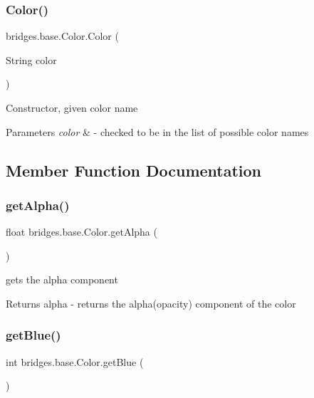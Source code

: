 \subsubsection{\texorpdfstring{Color()}{Color()}\hspace{0.1cm}{\footnotesize\ttfamily [4/4]}}
{\footnotesize\ttfamily bridges.\+base.\+Color.\+Color (\begin{DoxyParamCaption}\item[{String}]{color }\end{DoxyParamCaption})}

Constructor, given color name


\begin{DoxyParams}{Parameters}
{\em color} & -\/ checked to be in the list of possible color names \\
\hline
\end{DoxyParams}


\subsection{Member Function Documentation}
\mbox{\label{classbridges_1_1base_1_1_color_a7c4247e31ecd8fcc61ef208d5deefe68}} 
\subsubsection{\texorpdfstring{get\+Alpha()}{getAlpha()}}
{\footnotesize\ttfamily float bridges.\+base.\+Color.\+get\+Alpha (\begin{DoxyParamCaption}{ }\end{DoxyParamCaption})}

gets the alpha component

\begin{DoxyReturn}{Returns}
alpha -\/ returns the alpha(opacity) component of the color 
\end{DoxyReturn}
\mbox{\label{classbridges_1_1base_1_1_color_ad4b82e1eb9ff59857d2868edd8d4ce65}} 
\subsubsection{\texorpdfstring{get\+Blue()}{getBlue()}}
{\footnotesize\ttfamily int bridges.\+base.\+Color.\+get\+Blue (\begin{DoxyParamCaption}{ }\end{DoxyParamCaption})}

